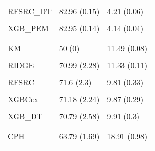 \begin{longtable}[t]{lll}
\hspace{1em}RFSRC\_DT & 82.96 (0.15) & 4.21 (0.06)\\
\hspace{1em}\cellcolor{gray!10}{XGBCox} & \cellcolor{gray!10}{83.11 (0.05)} & \cellcolor{gray!10}{4.13 (0.05)}\\
\hspace{1em}XGB\_PEM & 82.95 (0.14) & 4.14 (0.04)\\
\hspace{1em}\cellcolor{gray!10}{XGB\_DT} & \cellcolor{gray!10}{82.96 (0.12)} & \cellcolor{gray!10}{4.11 (0.03)}\\
\addlinespace[0.3em]
\multicolumn{3}{l}{\textbf{nwtco}}\\
\hspace{1em}KM & 50 (0) & 11.49 (0.08)\\
\hspace{1em}\cellcolor{gray!10}{CPH} & \cellcolor{gray!10}{71.13 (2.57)} & \cellcolor{gray!10}{10.1 (0.39)}\\
\hspace{1em}RIDGE & 70.99 (2.28) & 11.33 (0.11)\\
\hspace{1em}\cellcolor{gray!10}{GLMN} & \cellcolor{gray!10}{59.39 (7.5)} & \cellcolor{gray!10}{11.35 (0.12)}\\
\hspace{1em}RFSRC & 71.6 (2.3) & 9.81 (0.33)\\
\hspace{1em}\cellcolor{gray!10}{RFSRC\_DT} & \cellcolor{gray!10}{71.29 (2.13)} & \cellcolor{gray!10}{9.84 (0.28)}\\
\hspace{1em}XGBCox & 71.18 (2.24) & 9.87 (0.29)\\
\hspace{1em}\cellcolor{gray!10}{XGB\_PEM} & \cellcolor{gray!10}{71.2 (2.62)} & \cellcolor{gray!10}{9.83 (0.35)}\\
\hspace{1em}XGB\_DT & 70.79 (2.58) & 9.91 (0.3)\\
\addlinespace[0.3em]
\multicolumn{3}{l}{\textbf{tumor}}\\
\hspace{1em}\cellcolor{gray!10}{KM} & \cellcolor{gray!10}{50 (0)} & \cellcolor{gray!10}{20.06 (0.56)}\\
\hspace{1em}CPH & 63.79 (1.69) & 18.91 (0.98)\\
\hspace{1em}\cellcolor{gray!10}{RIDGE} & \cellcolor{gray!10}{63.9 (1.84)} & \cellcolor{gray!10}{20.06 (0.56)}\\

\end{longtable}
